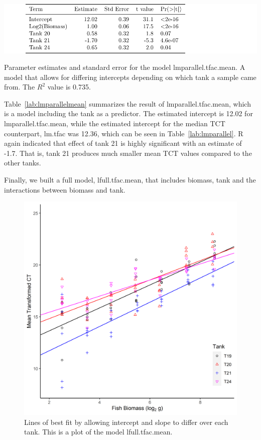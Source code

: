 \begin{table}[H]
\includegraphics{Chapter3Images/lmMean2.pdf}
\caption{Parameter estimates and standard error for the model lmparallel.tfac.mean. A model that allows for differing intercepts depending on which tank a sample came from. The $R^{2}$ value is 0.735.}
\label{lab:lmparallelmean}
\end{table}


Table~\ref{lab:lmparallelmean} summarizes the result of lmparallel.tfac.mean, which is a model including the tank as a predictor. The estimated intercept is 12.02 for lmparallel.tfac.mean, while the estimated intercept for the median TCT counterpart, lm.tfac was 12.36, which can be seen in Table~\ref{lab:lmparallel}. R again indicated that effect of tank 21 is highly significant with an estimate of -1.7. That is, tank 21 produces much smaller mean TCT values compared to the other tanks.




\newpage

Finally, we built a full model, lfull.tfac.mean, that includes biomass, tank and the interactions between biomass and tank.

\begin{figure}[H]
\includegraphics{Chapter3Images/ggplotnew7.png}
\caption{ Lines of best fit by allowing intercept and slope to differ over each tank. This is a plot of the model lfull.tfac.mean.}
\label{fig:parmean}
\end{figure}


